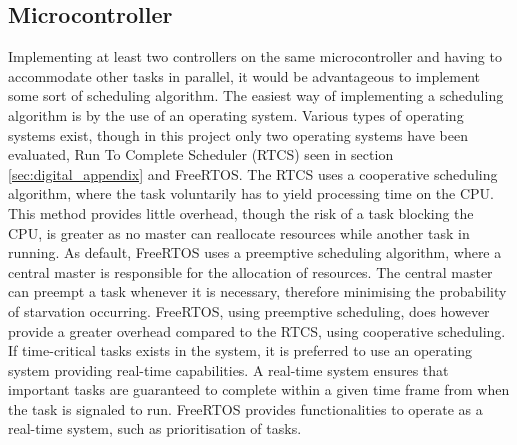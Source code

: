 \documentclass[../../main.tex]{subfiles}
\begin{document}
\subsection*{Microcontroller}
Implementing at least two controllers on the same microcontroller and having to accommodate other tasks in parallel, it would be advantageous to implement some sort of scheduling algorithm. The easiest way of implementing a scheduling algorithm is by the use of an operating system. Various types of operating systems exist, though in this project only two operating systems have been evaluated, Run To Complete Scheduler (RTCS) seen in section \ref{sec:digital_appendix} and FreeRTOS. The RTCS uses a cooperative scheduling algorithm, where the task voluntarily has to yield processing time on the CPU. This method provides little overhead, though the risk of a task blocking the CPU, is greater as no master can reallocate resources while another task in running. 
As default, FreeRTOS uses a preemptive scheduling algorithm, where a central master is responsible for the allocation of resources. The central master can preempt a task whenever it is necessary, therefore minimising the probability of starvation occurring. FreeRTOS, using preemptive scheduling, does however provide a greater overhead compared to the RTCS, using cooperative scheduling. If time-critical tasks exists in the system, it is preferred to use an operating system providing real-time capabilities. A real-time system ensures that important tasks are guaranteed to complete within a given time frame from when the task is signaled to run. FreeRTOS provides functionalities to operate as a real-time system, such as prioritisation of tasks.   





\end{document}
